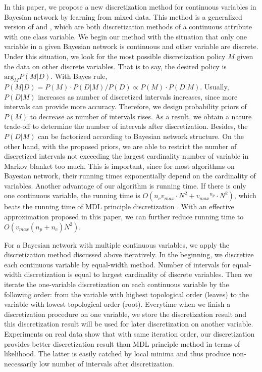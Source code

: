 In this paper, we propose a new discretization method for continuous variables in Bayesian network by learning from mixed data. This method is a generalized version of  \citet{Boulle_2006} and \citet{Lustgarten_2011}, which are both discretization methods of a continuous attribute with one class variable. We begin our method with the situation that only one variable in a given Bayesian network is continuous and other variable are discrete. Under this situation, we look for the most possible discretization policy $M$ given the data on other discrete variables. That is to say, the desired policy is $\textrm{arg}_M P(M|D)$. With Bayes rule, $P(M|D) = P(M) \cdot P(D|M) / P(D) \propto P(M)\cdot P(D|M)$. Usually, $P(D|M)$ increases as number of discretized intervals increases, since more intervals can provide more accuracy. Therefore, we design probability priors of $P(M)$ to decrease as number of intervals rises. As a result, we obtain a nature trade-off to determine the number of intervals after discretization. Besides, the $P(D|M)$ can be factorized according to Bayesian network structure. On the other hand, with the proposed priors, we are able to restrict the number of discretized intervals not exceeding the largest cardinality number of variable in Markov blanket too much. This is important, since for most algorithms on Bayesian network, their running times exponentially depend on the cardinality of variables. Another advantage of our algorithm is running time. If there is only one continuous variable, the running time is $O(n_c  {v_{max}} \cdot N^2 + {v_{max}}^{n_p} \cdot N^2)$, which beats the running time of MDL principle discretization \citep{Friedman_1996}. With an effective approximation proposed in this paper, we can further reduce running time to $O({v_{max}}(n_p+n_c)N^2)$.

For a Bayesian network with multiple continuous variables, we apply the discretization method discussed above iteratively. In the beginning, we discretize each continuous variable by equal-width method. Number of intervals for equal-width discretization is equal to largest cardinality of discrete variables. Then we iterate the one-variable discretization on each continuous variable by the following order: from the variable with highest topological order (leaves) to the variable with lowest topological order (root). Everytime when we finish a discretization procedure on one variable, we store the discretization result and this discretization result will be used for later discretization on another variable. Experiments on real data show that with same iteration order, our discretization provides better discretization result than MDL principle method in terms of likelihood. The latter is easily catched by local minima and thus produce non-necessarily low number of intervals after discretization.

